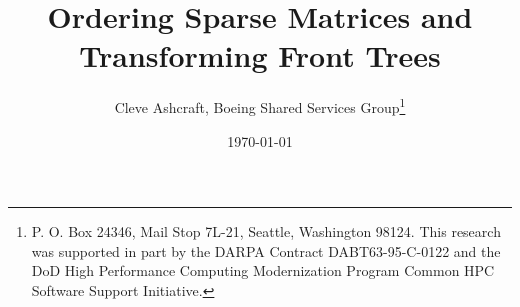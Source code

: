 \documentclass[leqno,10pt,twoside]{article}
\begin{document}


\title{Ordering Sparse Matrices and Transforming Front Trees}

\author{Cleve Ashcraft,
        Boeing Shared Services Group\thanks{
      P. O. Box 24346,
      Mail Stop 7L-21,
      Seattle, Washington 98124.
      This research was supported in part by the DARPA
      Contract DABT63-95-C-0122 and the DoD High Performance Computing
      Modernization Program Common HPC Software Support Initiative.}
}

\date{\today}
\maketitle








\end{document}
